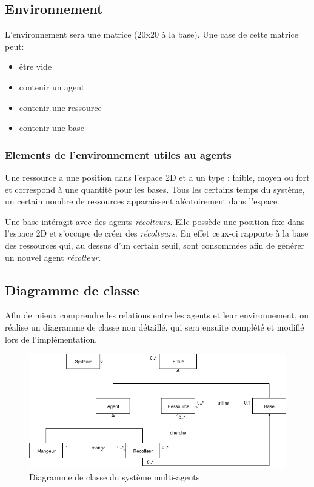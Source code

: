 \documentclass{article}
\begin{document}
\subsection{Environnement}
L'environnement sera une matrice (20x20 à la base). Une case de cette matrice peut:
\begin{itemize}
  \item être vide
  \item contenir un agent
  \item contenir une ressource
  \item contenir une base
\end{itemize}

\subsubsection{Elements de l'environnement utiles au agents}

Une ressource a une position dans l'espace 2D et a un type : faible, moyen ou fort et
correspond à une quantité pour les bases. Tous les certains temps du système, un certain
nombre de ressources apparaissent aléatoirement dans l'espace.

Une base intéragit avec des agents \emph{récolteurs}. Elle possède une position fixe
dans l'espace 2D et s'occupe de créer des \emph{récolteurs}. En effet ceux-ci rapporte
à la base des ressources qui, au dessus d'un certain seuil, sont consommées afin de
générer un nouvel agent \emph{récolteur}.

\subsection{Diagramme de classe}
Afin de mieux comprendre les relations entre les agents et leur environnement, on
réalise un diagramme de classe non détaillé, qui sera ensuite complété et modifié
lors de l'implémentation.

\begin{figure}[!ht]
  \centering
  \caption{Diagramme de classe du système multi-agents}
  \includegraphics[scale=0.70]{img/class_agents.png}
\end{figure}
\end{document}

